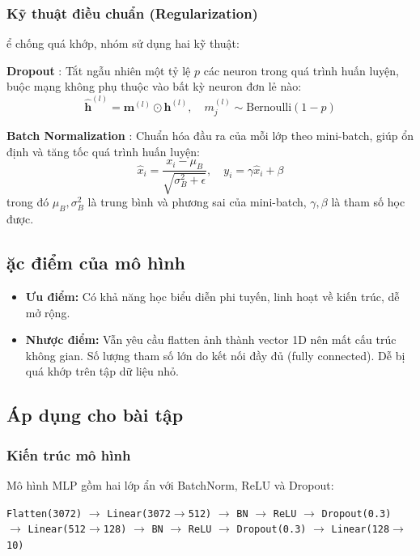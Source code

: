 \documentclass[a4paper]{article}
\theoremstyle{definition}
\begin{document}
\subsubsection{Kỹ thuật điều chuẩn (Regularization)}
\DJ ể chống quá khớp, nhóm sử dụng hai kỹ thuật:

\textbf{Dropout} \cite{srivastava2014dropout}: Tắt ngẫu nhiên một tỷ lệ $p$ các neuron trong quá trình huấn luyện, buộc mạng không phụ thuộc vào bất kỳ neuron đơn lẻ nào:
\begin{equation}
	\hat{\mathbf{h}}^{(l)} = \mathbf{m}^{(l)} \odot \mathbf{h}^{(l)}, \quad m_j^{(l)} \sim \text{Bernoulli}(1-p)
\end{equation}

\textbf{Batch Normalization} \cite{ioffe2015batch}: Chuẩn hóa đầu ra của mỗi lớp theo mini-batch, giúp ổn định và tăng tốc quá trình huấn luyện:
\begin{equation}
	\hat{x}_i = \frac{x_i - \mu_B}{\sqrt{\sigma_B^2 + \epsilon}}, \quad y_i = \gamma \hat{x}_i + \beta
\end{equation}
trong đó $\mu_B, \sigma_B^2$ là trung bình và phương sai của mini-batch, $\gamma, \beta$ là tham số học được.

\subsection{\DJ ặc điểm của mô hình}
\begin{itemize}
	\item \textbf{Ưu điểm:} Có khả năng học biểu diễn phi tuyến, linh hoạt về kiến trúc, dễ mở rộng.
	\item \textbf{Nhược điểm:} Vẫn yêu cầu flatten ảnh thành vector 1D nên mất cấu trúc không gian. Số lượng tham số lớn do kết nối đầy đủ (fully connected). Dễ bị quá khớp trên tập dữ liệu nhỏ.
\end{itemize}

\subsection{Áp dụng cho bài tập}

\subsubsection{Kiến trúc mô hình}
Mô hình MLP gồm hai lớp ẩn với BatchNorm, ReLU và Dropout:

\begin{center}
\texttt{Flatten(3072)} $\to$ \texttt{Linear(3072$\to$512)} $\to$ \texttt{BN} $\to$ \texttt{ReLU} $\to$ \texttt{Dropout(0.3)} \\
$\to$ \texttt{Linear(512$\to$128)} $\to$ \texttt{BN} $\to$ \texttt{ReLU} $\to$ \texttt{Dropout(0.3)} $\to$ \texttt{Linear(128$\to$10)}
\end{center}
\end{document}
